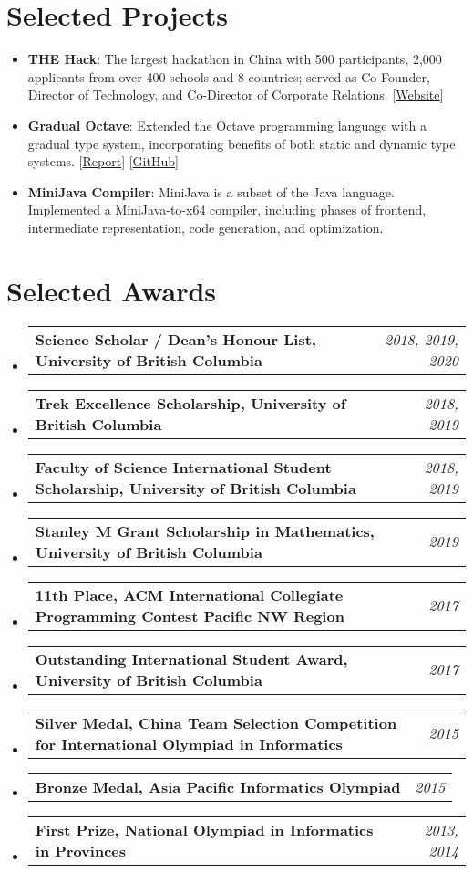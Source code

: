 \documentclass[letterpaper,11pt]{article}
\makeatletter
\newcommand{\resumeItem}[2]{
  \item\small{
    \textbf{#1}{: #2 \vspace{-2pt}}
  }
}
\newcommand{\awardSubItem}[2]{
  \item
    \begin{tabular*}{0.97\textwidth}{l@{\extracolsep{\fill}}r}
      \textbf{\small #1} & \textit{\small #2} \\
    \end{tabular*}\vspace{-8pt}
}
\newcommand{\resumeSubItem}[2]{\resumeItem{#1}{#2}\vspace{-4pt}}
\newcommand{\resumeSubHeadingListStart}{\begin{itemize}[leftmargin=*]}
\newcommand{\resumeSubHeadingListEnd}{\end{itemize}}
\makeatother
\begin{document}
\section{Selected Projects}
  \resumeSubHeadingListStart
    \resumeSubItem{THE Hack}
      {The largest hackathon in China with 500 participants, 2,000 applicants from over 400 schools and 8 countries; served as Co-Founder, Director of Technology, and Co-Director of Corporate Relations. [\href{https://2018.thehack.org.cn/}{Website}]}
    \resumeSubItem{Gradual Octave}
      {Extended the Octave programming language with a gradual type system, incorporating benefits of both static and dynamic type systems. [\href{http://ypan.me/docs/gradual-octave.pdf}{Report}] [\href{https://github.com/yuchong-pan/gradual-octave}{GitHub}]}
    \resumeSubItem{MiniJava Compiler}
      {MiniJava is a subset of the Java language. Implemented a MiniJava-to-x64 compiler, including phases of frontend, intermediate representation, code generation, and optimization.}
  \resumeSubHeadingListEnd

\section{Selected Awards}
  \resumeSubHeadingListStart
    \awardSubItem{Science Scholar / Dean's Honour List, University of British Columbia}{2018, 2019, 2020}
    \awardSubItem{Trek Excellence Scholarship, University of British Columbia}{2018, 2019}
    \awardSubItem{Faculty of Science International Student Scholarship, University of British Columbia}{2018, 2019}
    \awardSubItem{Stanley M Grant Scholarship in Mathematics, University of British Columbia}{2019}
    \awardSubItem{11th Place, ACM International Collegiate Programming Contest Pacific NW Region}{2017}
    \awardSubItem{Outstanding International Student Award, University of British Columbia}{2017}
    \awardSubItem{Silver Medal, China Team Selection Competition for International Olympiad in Informatics}{2015}
    \awardSubItem{Bronze Medal, Asia Pacific Informatics Olympiad}{2015}
    \awardSubItem{First Prize, National Olympiad in Informatics in Provinces}{2013, 2014}
  \resumeSubHeadingListEnd
\end{document}
